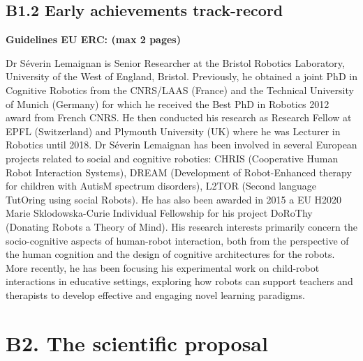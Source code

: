 \documentclass[]{article}
\newcommand{\eu}[1]{{\color{teal}\textbf{Guidelines EU ERC: #1}}}
\begin{document}
\subsection{B1.2 Early achievements track-record}\label{early-achievements-track-record}

\eu{(max 2 pages)}

Dr Séverin Lemaignan is Senior Researcher at the Bristol Robotics
Laboratory, University of the West of England, Bristol. Previously, he
obtained a joint PhD in Cognitive Robotics from the CNRS/LAAS (France)
and the Technical University of Munich (Germany) for which he received
the Best PhD in Robotics 2012 award from French CNRS. He then conducted
his research as Research Fellow at EPFL (Switzerland) and Plymouth
University (UK) where he was Lecturer in Robotics until 2018. Dr Séverin
Lemaignan has been involved in several European projects related to
social and cognitive robotics: CHRIS (Cooperative Human Robot
Interaction Systems), DREAM (Development of Robot-Enhanced therapy for
children with AutisM spectrum disorders), L2TOR (Second language
TutOring using social Robots). He has also been awarded in 2015 a EU
H2020 Marie Sklodowska-Curie Individual Fellowship for his project
DoRoThy (Donating Robots a Theory of Mind). His research interests
primarily concern the socio-cognitive aspects of human-robot
interaction, both from the perspective of the human cognition and the
design of cognitive architectures for the robots. More recently, he has
been focusing his experimental work on child-robot interactions in
educative settings, exploring how robots can support teachers and
therapists to develop effective and engaging novel learning paradigms.
















\newpage

\section{B2. The scientific proposal}\label{part-b2-the-scientific-proposal}
\end{document}
